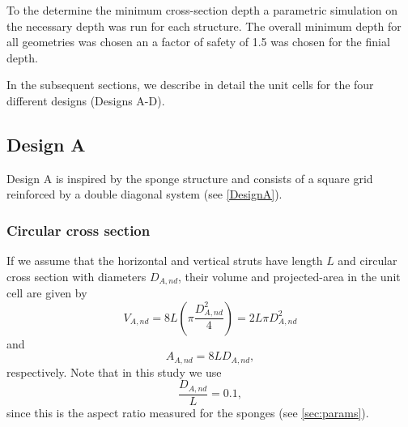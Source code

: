 \documentclass[10pt,twoside]{fernandes_supp}
\begin{document}
To the determine the minimum cross-section depth a parametric simulation on the necessary depth was run for each structure. The overall minimum depth for all geometries was chosen an a factor of safety of 1.5 was chosen for the finial depth.

In the subsequent sections, we describe in detail the unit cells for the four different designs (Designs A-D).


\subsection{Design A}
Design A is inspired by the sponge structure and consists of a square grid  reinforced by a double diagonal system (see \cref{DesignA}). 
\subsubsection{Circular cross section} 
If we assume that the horizontal and vertical struts have length $L$ and circular cross section  with diameters $D_{A,nd}$, their volume and projected-area in the unit cell are given by 
\begin{equation}\label{V1}
V_{A,nd}=8 L \left(\pi\frac{D^2_{A,nd}}{4}\right)=2 L \pi D^2_{A,nd}
\end{equation}
and
\begin{equation}\label{A1}
A_{A,nd}=8 L D_{A,nd},
\end{equation}
respectively. Note that in this study we use 
\begin{equation}
\frac{D_{A,nd}}{L}=0.1,
\end{equation}
since this is the aspect ratio measured for the sponges (see \cref{sec:params}).
\end{document}
